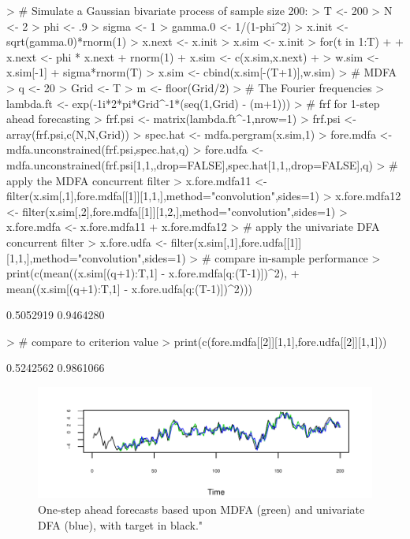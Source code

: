 \documentclass[a4paper]{book}
\begin{document}
\begin{Schunk}
\begin{Sinput}
> # Simulate a Gaussian bivariate process of sample size 200:
> T <- 200
> N <- 2
> phi <- .9
> sigma <- 1
> gamma.0 <- 1/(1-phi^2)
> x.init <- sqrt(gamma.0)*rnorm(1)
> x.next <- x.init
> x.sim <- x.init
> for(t in 1:T)
+ {
+ 	x.next <- phi * x.next + rnorm(1)
+ 	x.sim <- c(x.sim,x.next)
+ }
> w.sim <- x.sim[-1] + sigma*rnorm(T)
> x.sim <- cbind(x.sim[-(T+1)],w.sim)
> # MDFA
> q <- 20
> Grid <- T
> m <- floor(Grid/2)
> # The Fourier frequencies
> lambda.ft <- exp(-1i*2*pi*Grid^{-1}*(seq(1,Grid) - (m+1)))
> # frf for 1-step ahead forecasting
> frf.psi <- matrix(lambda.ft^{-1},nrow=1) %
> frf.psi <- array(frf.psi,c(N,N,Grid))
> spec.hat <- mdfa.pergram(x.sim,1)	
> fore.mdfa <- mdfa.unconstrained(frf.psi,spec.hat,q)
> fore.udfa <- mdfa.unconstrained(frf.psi[1,1,,drop=FALSE],spec.hat[1,1,,drop=FALSE],q)
> # apply the MDFA concurrent filter
> x.fore.mdfa11 <- filter(x.sim[,1],fore.mdfa[[1]][1,1,],method="convolution",sides=1)
> x.fore.mdfa12 <- filter(x.sim[,2],fore.mdfa[[1]][1,2,],method="convolution",sides=1)
> x.fore.mdfa <- x.fore.mdfa11 + x.fore.mdfa12 
> # apply the univariate DFA concurrent filter
> x.fore.udfa <- filter(x.sim[,1],fore.udfa[[1]][1,1,],method="convolution",sides=1)
> # compare in-sample performance
> print(c(mean((x.sim[(q+1):T,1] - x.fore.mdfa[q:(T-1)])^2),
+ 	mean((x.sim[(q+1):T,1] - x.fore.udfa[q:(T-1)])^2)))
\end{Sinput}
\begin{Soutput}
[1] 0.5052919 0.9464280
\end{Soutput}
\begin{Sinput}
> # compare to criterion value
> print(c(fore.mdfa[[2]][1,1],fore.udfa[[2]][1,1]))
\end{Sinput}
\begin{Soutput}
[1] 0.5242562 0.9861066
\end{Soutput}
\end{Schunk}


\begin{figure}[htb!]
\begin{center}
\includegraphics[]{"mdfa_bimdfa-udfa.pdf"}
\caption{One-step ahead forecasts
 based upon MDFA (green) and univariate DFA (blue), with target in black."}
\label{fig:easing1}
\end{center}
\end{figure}
\end{document}
